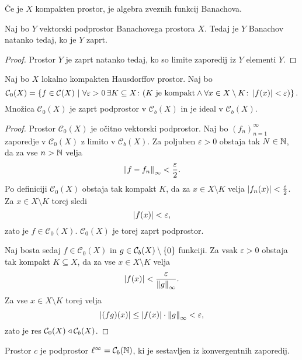 \begin{opomba}
Če je $X$ kompakten prostor, je algebra zveznih funkcij Banachova.
\end{opomba}

\begin{trditev}
Naj bo $Y$ vektorski podprostor Banachovega prostora $X$. Tedaj je
$Y$ Banachov natanko tedaj, ko je $Y$ zaprt.
\end{trditev}

\begin{proof}
Prostor $Y$ je zaprt natanko tedaj, ko so limite zaporedij iz $Y$
elementi $Y$.
\end{proof}

\begin{zgled}
Naj bo $X$ lokalno kompakten Hausdorffov prostor. Naj bo
\[
\mathcal{C}_0(X) =
\left\{f \in \mathcal{C}(X)~\middle\vert~\forall \varepsilon > 0\,
\exists K \subseteq X \colon (\text{$K$ je kompakt} \land
\forall x \in X \setminus K \colon \left\lvert f(x)\right\rvert < \varepsilon)\right\}.
\]
Množica $\mathcal{C}_0(X)$ je zaprt podprostor v $\mathcal{C}_b(X)$
in je ideal v $\mathcal{C}_b(X)$.
\end{zgled}

\begin{proof}
Prostor $\mathcal{C}_0(X)$ je očitno vektorski podprostor. Naj bo
$(f_n)_{n=1}^\infty$ zaporedje v $\mathcal{C}_0(X)$ z limito v
$\mathcal{C}_b(X)$. Za poljuben $\varepsilon > 0$ obstaja tak
$N \in \mathbb{N}$, da za vse $n > \mathbb{N}$ velja
\[
\left\lVert f - f_n\right\rVert_\infty < \frac{\varepsilon}{2}.
\]
Po definiciji $\mathcal{C}_0(X)$ obstaja tak kompakt $K$, da za
$x \in X \setminus K$ velja $\left\lvert f_n(x)\right\rvert < \frac{\varepsilon}{2}$.
Za $x \in X \setminus K$ torej sledi
\[
\left\lvert f(x)\right\rvert < \varepsilon,
\]
zato je $f \in \mathcal{C}_0(X)$. $\mathcal{C}_0(X)$ je torej zaprt
podprostor.

Naj bosta sedaj $f \in \mathcal{C}_0(X)$ in
$g \in \mathcal{C}_b(X) \setminus \left\{0\right\}$ funkciji. Za vsak
$\varepsilon > 0$ obstaja tak kompakt $K \subseteq X$, da za vse
$x \in X \setminus K$ velja
\[
\left\lvert f(x)\right\rvert < \frac{\varepsilon}{\left\lVert g\right\rVert_\infty}.
\]
Za vse $x \in X \setminus K$ torej velja
\[
\left\lvert (fg)(x)\right\rvert \leq \left\lvert f(x)\right\rvert \cdot \left\lVert g\right\rVert_\infty < \varepsilon,
\]
zato je res $\mathcal{C}_0(X) \triangleleft \mathcal{C}_b(X)$.
\end{proof}

\begin{definicija}
Prostor $c$ je podprostor $\ell^\infty = \mathcal{C}_b(\mathbb{N})$, ki je
sestavljen iz konvergentnih zaporedij.
\end{definicija}

